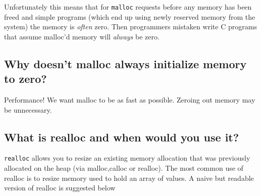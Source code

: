 Unfortunately this means that for \texttt{malloc} requests before any
memory has been freed and simple programs (which end up using newly
reserved memory from the system) the memory is \emph{often} zero. Then
programmers mistaken write C programs that assume malloc'd memory will
\emph{always} be zero.

\begin{Shaded}
\begin{Highlighting}[]
\NormalTok{);}
 \NormalTok{); }
\end{Highlighting}
\end{Shaded}

\subsection{Why doesn't malloc always initialize memory to
zero?}\label{why-doesnt-malloc-always-initialize-memory-to-zero}

Performance! We want malloc to be as fast as possible. Zeroing out
memory may be unnecessary.

\subsection{What is realloc and when would you use
it?}\label{what-is-realloc-and-when-would-you-use-it}

\texttt{realloc} allows you to resize an existing memory allocation that
was previously allocated on the heap (via malloc,calloc or realloc). The
most common use of realloc is to resize memory used to hold an array of
values. A naive but readable version of realloc is suggested below

\begin{Shaded}
\begin{Highlighting}[]
  
   
   
   
\NormalTok{\}}
\end{Highlighting}
\end{Shaded}

